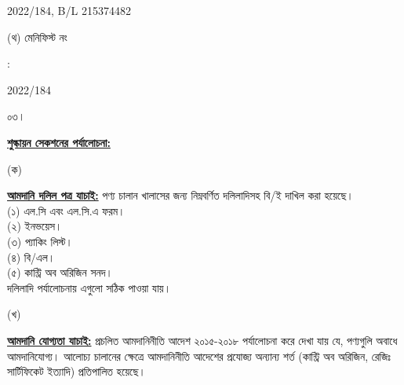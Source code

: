 \documentclass[12pt]{article}
\newcommand{\blno}{215374482}
\newcommand{\menifest}{2022/184}
\begin{document}
\begin{minipage}[t]{0.53\linewidth}
{\menifest}, B/L {\blno}
\\
\end{minipage}
\begin{minipage}[t]{0.05\linewidth}
\hspace*{1em}
\end{minipage}
\begin{minipage}[t]{0.40\linewidth}
(থ) মেনিফিস্ট নং
\end{minipage}
\begin{minipage}[t]{0.02\linewidth}
:
\end{minipage}
\begin{minipage}[t]{0.53\linewidth}
{\menifest}
\\
\end{minipage}
\normalsize
\begin{minipage}[t]{0.05\linewidth}
০৩।
\end{minipage}
\begin{minipage}[t]{0.95\linewidth}
\underline{\textbf{শুল্কায়ন সেকশনের পর্যালোচনা:}}
\end{minipage}
\begin{minipage}[t]{0.05\linewidth}
\hspace{1em}
\end{minipage}
\begin{minipage}[t]{0.05\linewidth}
(ক)
\end{minipage}
\begin{minipage}[t]{0.90\linewidth}
\underline{\textbf{আমদানি দলিল পত্র যাচাই:}}
পণ্য চালান খালাসের জন্য নিম্নবর্ণিত দলিলাদিসহ বি/ই দাখিল করা
হয়েছে।
\\
(১) এল.সি এবং এল.সি.এ ফরম।
\\
(২) ইনভয়েস।
\\
(৩) প্যাকিং লিস্ট।
\\
(৪) বি/এল।
\\
(৫) কান্ট্রি অব অরিজিন সনদ।
\\
দলিলাদি পর্যালোচনায় এগুলো
সঠিক পাওয়া যায়।
\\
\end{minipage}
\begin{minipage}[t]{0.05\linewidth}
\hspace{1em}
\end{minipage}
\begin{minipage}[t]{0.05\linewidth}
(খ)
\end{minipage}
\begin{minipage}[t]{0.90\linewidth}
\underline{\textbf{আমদানি যোগ্যতা যাচাই:}}
প্রচলিত আমদানিনীতি আদেশ ২০১৫-২০১৮  পর্যালোচনা করে দেখা যায় যে, পণ্যগুলি অবাধে আমদানিযোগ্য।
আলোচ্য চালানের ক্ষেত্রে আমদানিনীতি আদেশের প্রযোজ্য অন্যান্য শর্ত (কান্ট্রি অব অরিজিন, রেজিঃ
সার্টিফিকেট ইত্যাদি) প্রতিপালিত হয়েছে।
\\
\end{minipage}
\end{document}
